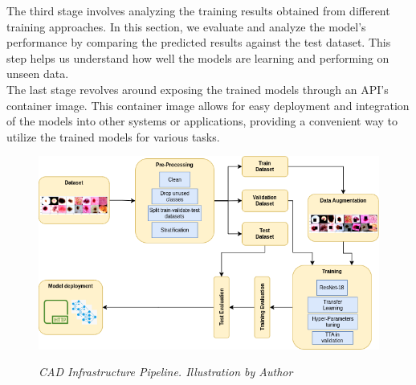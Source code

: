 The third stage involves analyzing the training results obtained from different
training approaches. In this section, we evaluate and analyze the model's
performance by comparing the predicted results against the test dataset. This
step helps us understand how well the models are learning and performing on
unseen data. \\

The last stage revolves around exposing the trained models through an API's
container image. This container image allows for easy deployment and
integration of the models into other systems or applications, providing a
convenient way to utilize the trained models for various tasks. \\


\begin{figure}[H]
  \centering
  \includegraphics[width=\textwidth]{imatges/methodological_contribution/Pipeline.drawio.png}
  \caption[CAD Infrastructure Pipeline]{\textit{CAD Infrastructure Pipeline. Illustration by Author}}
  {\label{fig:cad-infrastructure-training-system}}
\end{figure}
